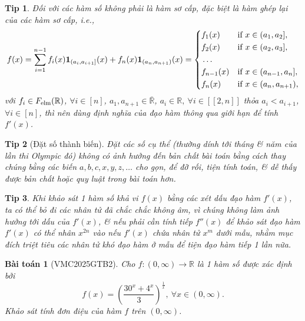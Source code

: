 \documentclass{article}
\newtheorem{baitoan}{Bài toán}
\newtheorem{tip}{Tip}
\begin{document}
\begin{tip}
	Đối với các hàm số không phải là hàm sơ cấp, đặc biệt là hàm ghép lại của các hàm sơ cấp, i.e.,
	\begin{equation*}
		f(x) = \sum_{i=1}^{n-1} f_i(x){\bf1}_{(a_i,a_{i+1}]}(x) + f_n(x){\bf1}_{(a_n,a_{n+1})}(x) = \left\{\begin{split}
			&f_1(x)&&\mbox{if } x\in(a_1,a_2],\\
			&f_2(x)&&\mbox{if } x\in(a_2,a_3],\\
			&\ldots\\
			&f_{n-1}(x)&&\mbox{if } x\in(a_{n-1},a_n],\\
			&f_n(x)&&\mbox{if } x\in(a_n,a_{n+1}),
		\end{split}\right.
	\end{equation*}
	với $f_i\in F_{\rm elm}(\mathbb{R})$, $\forall i\in[n]$, $a_1,a_{n+1}\in\overline{\mathbb{R}}$, $a_i\in\mathbb{R},\ \forall i\in[[2,n]]$ thỏa $a_i < a_{i+1}$, $\forall i\in[n]$, thì nên dùng định nghĩa của đạo hàm thông qua giới hạn để tính $f'(x)$.
\end{tip}

\begin{tip}[Đặt số thành biến]
	Đặt các số cụ thể (thường dính tới tháng \& năm của lần thi Olympic đó) không có ảnh hưởng đến bản chất bài toán bằng cách thay chúng bằng các biến $a,b,c,x,y,z,\ldots$ cho gọn, để đỡ rối, tiện tính toán, \& dễ thấy được bản chất hoặc quy luật trong bài toán hơn.
\end{tip}

\begin{tip}
	Khi khảo sát 1 hàm số khả vi $f(x)$ bằng các xét dấu đạo hàm $f'(x)$, ta có thể bỏ đi các nhân tử đã chắc chắc không âm, vì chúng không làm ảnh hưởng tới dấu của $f'(x)$, \& nếu phải cần tính tiếp $f''(x)$ để khảo sát đạo hàm $f'(x)$ có thể nhân $x^{2n}$ vào nếu $f'(x)$ chứa nhân tử $x^m$ dưới mẫu, nhằm mục đích triệt tiêu các nhân tử khó đạo hàm ở mẫu để tiện đạo hàm tiếp 1 lần nữa.
\end{tip}

\begin{baitoan}[VMC2025GTB2]
	Cho $f:(0,\infty)\to\mathbb{R}$ là 1 hàm số được xác định bởi
	\begin{equation*}
		f(x) = \left(\frac{30^x + 4^x}{3}\right)^{\frac{1}{x}},\ \forall x\in(0,\infty).
	\end{equation*}
	Khảo sát tính đơn điệu của hàm $f$ trên $(0,\infty)$.
\end{baitoan}
\end{document}
